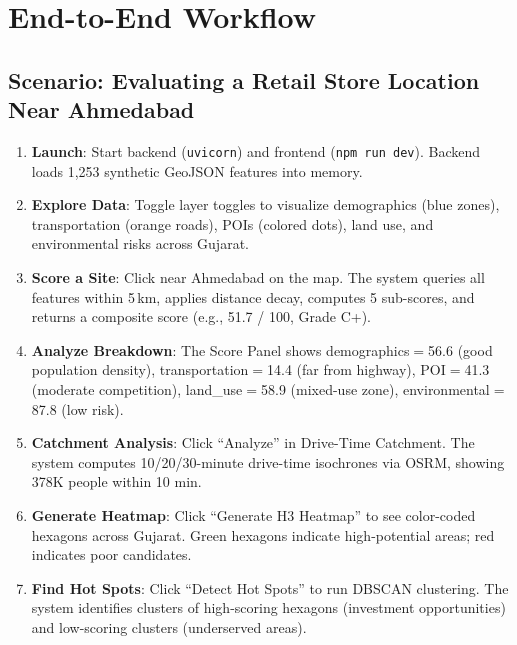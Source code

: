 \documentclass[12pt, a4paper]{article}
\begin{document}
\section{End-to-End Workflow}

\subsection{Scenario: Evaluating a Retail Store Location Near Ahmedabad}

\begin{enumerate}[leftmargin=2em, itemsep=8pt]
    \item \textbf{Launch}: Start backend (\texttt{uvicorn}) and frontend (\texttt{npm run dev}).
          Backend loads 1,253 synthetic GeoJSON features into memory.

    \item \textbf{Explore Data}: Toggle layer toggles to visualize demographics (blue zones),
          transportation (orange roads), POIs (colored dots), land use, and environmental
          risks across Gujarat.

    \item \textbf{Score a Site}: Click near Ahmedabad on the map. The system queries all
          features within 5\,km, applies distance decay, computes 5 sub-scores, and returns
          a composite score (e.g., 51.7 / 100, Grade C+).

    \item \textbf{Analyze Breakdown}: The Score Panel shows demographics$=$56.6 (good
          population density), transportation$=$14.4 (far from highway), POI$=$41.3
          (moderate competition), land\_use$=$58.9 (mixed-use zone), environmental$=$87.8
          (low risk).

    \item \textbf{Catchment Analysis}: Click ``Analyze'' in Drive-Time Catchment. The system
          computes 10/20/30-minute drive-time isochrones via OSRM, showing 378K people within 10 min.

    \item \textbf{Generate Heatmap}: Click ``Generate H3 Heatmap'' to see color-coded hexagons
          across Gujarat. Green hexagons indicate high-potential areas; red indicates poor candidates.

    \item \textbf{Find Hot Spots}: Click ``Detect Hot Spots'' to run DBSCAN clustering. The
          system identifies clusters of high-scoring hexagons (investment opportunities) and
          low-scoring clusters (underserved areas).


\end{enumerate}
\end{document}
